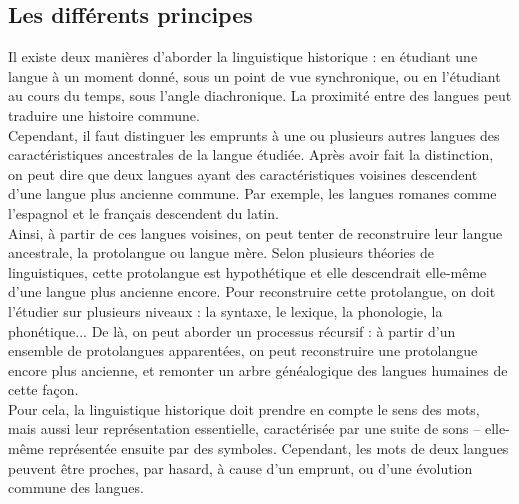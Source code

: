 \documentclass[12pt, french, twoside]{report}
\begin{document}
\subsection{Les différents principes} \label{principesLinguistique}

Il existe deux manières d'aborder la linguistique historique : en étudiant une langue à un moment donné, sous un point de vue synchronique, ou en l'étudiant au cours du temps, sous l'angle diachronique. 
La proximité entre des langues peut traduire une histoire commune.\\
Cependant, il faut distinguer les emprunts à une ou plusieurs autres langues des caractéristiques ancestrales de la langue étudiée. Après avoir fait la distinction, on peut dire que deux langues ayant des caractéristiques voisines descendent d'une langue plus ancienne commune. Par exemple, les langues romanes comme l'espagnol et le français descendent du latin.\\
Ainsi, à partir de ces langues voisines, on peut tenter de reconstruire leur langue ancestrale, la protolangue ou langue mère. Selon plusieurs théories de linguistiques, cette protolangue est hypothétique et elle descendrait elle-même d'une langue plus ancienne encore.
Pour reconstruire cette protolangue, on doit l'étudier sur plusieurs niveaux : la syntaxe, le lexique, la phonologie, la phonétique... De là, on peut aborder un processus récursif : à partir d'un ensemble de protolangues apparentées, on peut reconstruire une protolangue encore plus ancienne, et remonter un arbre généalogique des langues humaines de cette façon.\\
Pour cela, la linguistique historique doit prendre en compte le sens des mots, mais aussi leur représentation essentielle, caractérisée par une suite de sons -- elle-même représentée ensuite par des symboles. Cependant, les mots de deux langues peuvent être proches, par hasard, à cause d'un emprunt, ou d'une évolution commune des langues.\\
\end{document}
